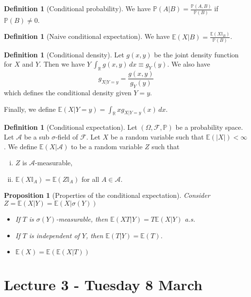 \documentclass[10pt, oneside, reqno]{amsart}
\theoremstyle{plain}%
\newtheorem{prop}[thm]{Proposition}
\theoremstyle{definition}
\newtheorem{defn}[thm]{Definition}
\theoremstyle{remark}
\newcommand{\expc}[1]{\mathbb{E}\left(#1\right)}
\newcommand{\R}{\mathbb{R}}
\renewcommand{\P}{\mathbb{P}}
\newcommand{\E}{\mathbb{E}}
\begin{document}
\begin{defn}[Conditional probability]
	We have $\P( A | B) = \frac{\P(A, B)}{\P(B)}$ if $\P(B) \neq 0$.
\end{defn}

\begin{defn}[Naive conditional expectation]
	We have $\expc{X | B} = \frac{ \expc{ X \mathbb{I}_B}}{\P(B)}$.
\end{defn}

\begin{defn}[Conditional density]
	Let $g(x,y)$ be the joint density function for $X$ and $Y$.  Then we have $Y ~ \int_\R g(x,y)\, dx \equiv g_Y(y)$.  We also have \[
		g_{X|Y = y} = \frac{g(x,y)}{g_Y(y)}
	\] which defines the conditional density given $Y = y$.
	
	Finally, we define $\expc{ X |Y = y} = \int_\R x g_{X|Y = y}(x) \,dx$.
\end{defn}

\begin{defn}[Conditional expectation]
	Let $(\Omega, \mathcal{F}, \P)$ be a probability space.  Let $\mathcal{A}$ be a sub $\sigma$-field of $\mathcal{F}$.  Let $X$ be a random variable such that $\E(|X|) < \infty$.  We define $\expc{X | \mathcal{A}}$ to be a random variable $Z$ such that 
	\begin{enumerate}[(i)]
		\item $Z$ is $\mathcal{A}$-measurable,
		\item $\E(X\mathbb{I}_A) = \E(Z\mathbb{I}_A)$ for all $A \in \mathcal{A}$.
	\end{enumerate}
\end{defn}


\begin{prop}[Properties of the conditional expectation]
	Consider $Z = \E(X|Y) = \E(X|\sigma(Y))$
	\begin{itemize}
		\item If $T$ is $\sigma(Y)$-measurable, then $\E(XT|Y) = T\E(X|Y)$ a.s.
		\item If $T$ is independent of $Y$, then $\E(T|Y) = \E(T)$.
		\item $\E(X) = \E(\E(X|T))$
	\end{itemize}
\end{prop}


\section{Lecture 3 - Tuesday 8 March} %
\label{sec:lecture_3_tuesday_8_march}
\end{document}

